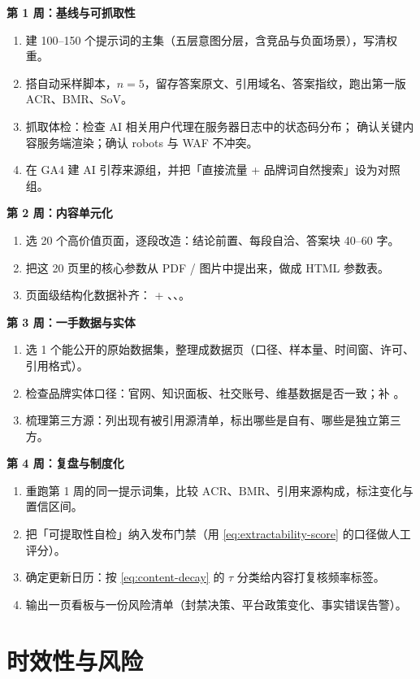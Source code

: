 \begin{toolbox}
\textbf{第 1 周：基线与可抓取性}
\begin{enumerate}
  \item 建 100--150 个提示词的主集（五层意图分层，含竞品与负面场景），写清权重。
  \item 搭自动采样脚本，$n=5$，留存答案原文、引用域名、答案指纹，跑出第一版 $\mathrm{ACR}$、$\mathrm{BMR}$、$\mathrm{SoV}$。
  \item 抓取体检：检查 AI 相关用户代理在服务器日志中的状态码分布；
        确认关键内容服务端渲染；确认 robots 与 WAF 不冲突。
  \item 在 GA4 建 AI 引荐来源组，并把「直接流量 + 品牌词自然搜索」设为对照组。
\end{enumerate}
\textbf{第 2 周：内容单元化}
\begin{enumerate}
  \item 选 20 个高价值页面，逐段改造：结论前置、每段自洽、答案块 40--60 字。
  \item 把这 20 页里的核心参数从 PDF / 图片中提出来，做成 HTML 参数表。
  \item 页面级结构化数据补齐： + 、、。
\end{enumerate}
\textbf{第 3 周：一手数据与实体}
\begin{enumerate}
  \item 选 1 个能公开的原始数据集，整理成数据页（口径、样本量、时间窗、许可、引用格式）。
  \item 检查品牌实体口径：官网、知识面板、社交账号、维基数据是否一致；补 。
  \item 梳理第三方源：列出现有被引用源清单，标出哪些是自有、哪些是独立第三方。
\end{enumerate}
\textbf{第 4 周：复盘与制度化}
\begin{enumerate}
  \item 重跑第 1 周的同一提示词集，比较 $\mathrm{ACR}$、$\mathrm{BMR}$、引用来源构成，标注变化与置信区间。
  \item 把「可提取性自检」纳入发布门禁（用 \cref{eq:extractability-score} 的口径做人工评分）。
  \item 确定更新日历：按 \cref{eq:content-decay} 的 $\tau$ 分类给内容打复核频率标签。
  \item 输出一页看板与一份风险清单（封禁决策、平台政策变化、事实错误告警）。
\end{enumerate}
\end{toolbox}

\section{时效性与风险}

